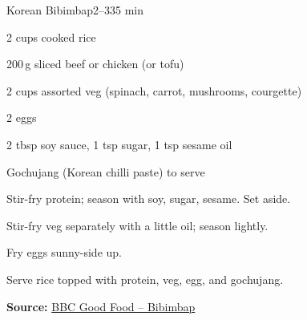 \begin{recipebox}{Korean Bibimbap}{2--3}{35 min}
\begin{ingredients}
  \item 2 cups cooked rice
  \item 200\,g sliced beef or chicken (or tofu)
  \item 2 cups assorted veg (spinach, carrot, mushrooms, courgette)
  \item 2 eggs
  \item 2 tbsp soy sauce, 1 tsp sugar, 1 tsp sesame oil
  \item Gochujang (Korean chilli paste) to serve
\end{ingredients}
\begin{method}
  \item Stir-fry protein; season with soy, sugar, sesame. Set aside.
  \item Stir-fry veg separately with a little oil; season lightly.
  \item Fry eggs sunny-side up.
  \item Serve rice topped with protein, veg, egg, and gochujang.
\end{method}
\textbf{Source:} \href{https://www.bbcgoodfood.com/recipes/bibimbap}{BBC Good Food – Bibimbap}
\end{recipebox}
